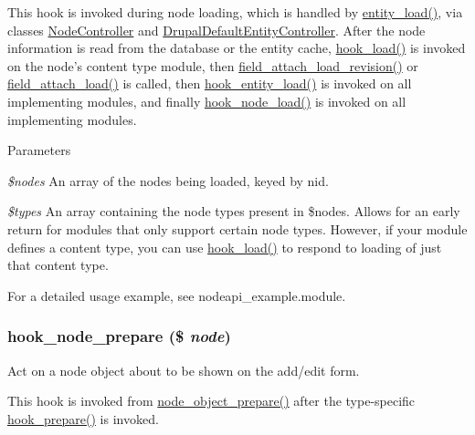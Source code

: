 This hook is invoked during node loading, which is handled by \hyperlink{common_8inc_a78b89cf93f9710a68d02f86adccf1898}{entity\_\-load()}, via classes \hyperlink{classNodeController}{NodeController} and \hyperlink{classDrupalDefaultEntityController}{DrupalDefaultEntityController}. After the node information is read from the database or the entity cache, \hyperlink{group__node__api__hooks_ga49065b040d7fb3e02889eda6361dac34}{hook\_\-load()} is invoked on the node's content type module, then \hyperlink{group__field__attach_gac79dd0f29910835c653b068233fa429b}{field\_\-attach\_\-load\_\-revision()} or \hyperlink{group__field__attach_ga1e92543395961c912eb293b50e991586}{field\_\-attach\_\-load()} is called, then \hyperlink{group__hooks_ga1f594647c8cbb27f75b77cc4118da8d6}{hook\_\-entity\_\-load()} is invoked on all implementing modules, and finally \hyperlink{group__node__api__hooks_gad48bb14b68ed38526029d1f7ac2d2de4}{hook\_\-node\_\-load()} is invoked on all implementing modules.


\begin{DoxyParams}{Parameters}
\item[{\em \$nodes}]An array of the nodes being loaded, keyed by nid. \item[{\em \$types}]An array containing the node types present in \$nodes. Allows for an early return for modules that only support certain node types. However, if your module defines a content type, you can use \hyperlink{group__node__api__hooks_ga49065b040d7fb3e02889eda6361dac34}{hook\_\-load()} to respond to loading of just that content type.\end{DoxyParams}
For a detailed usage example, see nodeapi\_\-example.module. \hypertarget{group__node__api__hooks_ga4bbe7320bd52fc6183920c8be2d9d4f6}{
\subsubsection[{hook\_\-node\_\-prepare}]{\setlength{\rightskip}{0pt plus 5cm}hook\_\-node\_\-prepare (\$ {\em node})}}
\label{group__node__api__hooks_ga4bbe7320bd52fc6183920c8be2d9d4f6}
Act on a node object about to be shown on the add/edit form.

This hook is invoked from \hyperlink{node_8module_ac12e464390fef44e55ddc2e0a35e9fe2}{node\_\-object\_\-prepare()} after the type-\/specific \hyperlink{group__node__api__hooks_ga2dff6dd92802df6b776a4eeb0b1a737c}{hook\_\-prepare()} is invoked.


